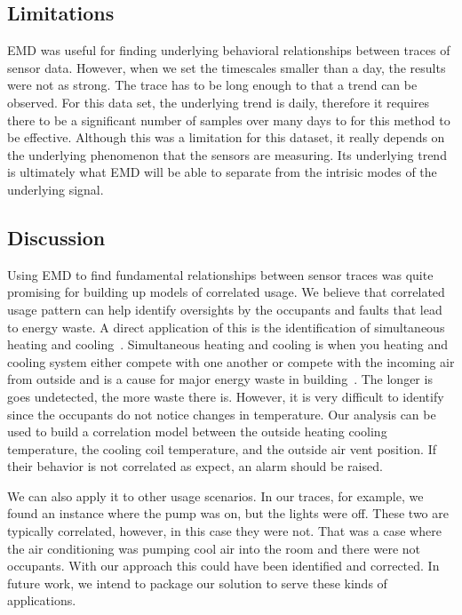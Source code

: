 \subsection{Limitations}
EMD was useful for finding underlying behavioral relationships between traces of sensor data.  However,
when we set the timescales smaller than a day, the results were not as strong.
The trace has to be long enough to that a trend can be observed.  For this data set, the underlying
trend is daily, therefore it requires there to be a significant number of samples over many days to
for this method to be effective.
Although this was a limitation for this dataset, it really depends on the underlying phenomenon that
the sensors are measuring.  Its underlying trend is ultimately what EMD will be able to separate
from the intrisic modes of the underlying signal.

\subsection{Discussion}
Using EMD to find fundamental relationships between sensor traces was quite promising for building
up models of correlated usage.  We believe that correlated usage pattern can help identify oversights
by the occupants and faults that lead to energy waste.  A direct application of this is the identification
of simultaneous heating and cooling~\cite{simheatcool}.  Simultaneous heating and cooling is when you heating
and cooling system either compete with one another or compete with the incoming air from outside and is
a cause for major energy waste in building~\cite{simheatcool_waste}.  The longer is goes undetected,
the more waste there is.  However, it is very difficult to identify since the occupants do not notice
changes in temperature.  Our analysis can be used to build a correlation model between the outside
heating cooling temperature, the cooling coil temperature, and the outside air vent position.  If their behavior
is not correlated as expect, an alarm should be raised.

We can also apply it to other usage scenarios.  In our traces, for example, we found an instance where the pump
was on, but the lights were off.  These two are typically correlated, however, in this case they were not.
That was a case where the air conditioning was pumping cool air into the room and there were not occupants.
With our approach this could have been identified and corrected.  In future work, we intend to
package our solution to serve these kinds of applications.

